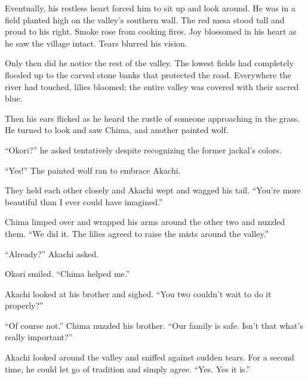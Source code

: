 Eventually, his restless heart forced him to sit up and look around. He was in a field planted high on the valley's southern wall. The red mesa stood tall and proud to his right. Smoke rose from cooking fires. Joy blossomed in his heart as he saw the village intact. Tears blurred his vision. 

Only then did he notice the rest of the valley. The lowest fields had completely flooded up to the carved stone banks that protected the road. Everywhere the river had touched, lilies bloomed; the entire valley was covered with their sacred blue.

Then his ears flicked as he heard the rustle of someone approaching in the grass. He turned to look and saw Chima, and another painted wolf. 

``Okori?'' he asked tentatively despite recognizing the former jackal's colors.

``Yes!'' The painted wolf ran to embrace Akachi.

They held each other closely and Akachi wept and wagged his tail. ``You're more beautiful than I ever could have imagined.''

Chima limped over and wrapped his arms around the other two and nuzzled them. ``We did it. The lilies agreed to raise the mists around the valley.''

``Already?'' Akachi asked.

Okori smiled. ``Chima helped me.''

Akachi looked at his brother and sighed. ``You two couldn't wait to do it properly?''

``Of course not.'' Chima nuzzled his brother. ``Our family is safe. Isn't that what's really important?''

Akachi looked around the valley and sniffed against sudden tears. For a second time, he could let go of tradition and simply agree. ``Yes. Yes it is.''

